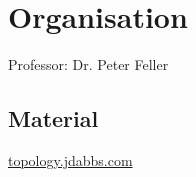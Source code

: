 \setcounter{section}{-1}
\section{Organisation}

Professor: Dr. Peter Feller

\subsection{Material}
\url{topology.jdabbs.com}


